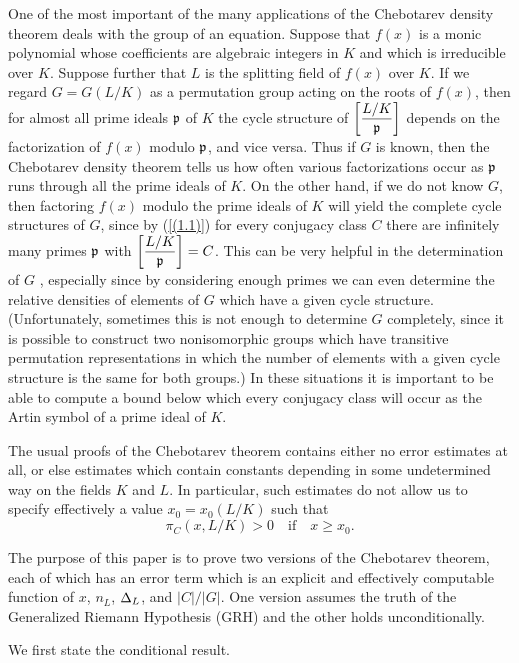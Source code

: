 \documentclass[./main]{subfiles}
\begin{document}
One of the most important of the many applications of the Chebotarev density theorem deals with the group of an equation. Suppose that $f(x)$ is a monic polynomial whose coefficients are algebraic integers in $K$ and which is irreducible over $K$. Suppose further that $L$ is the splitting field of $f(x)$ over $K$. If we regard $G = G(L/K)$ as a permutation group acting on the roots of $f(x)$, then for almost all prime ideals $\mathfrak{p}$ of $K$ the cycle structure of $\bigg[\dfrac{L/K}{\mathfrak{p}}\bigg]$ depends on the factorization of $f(x)$ modulo $\mathfrak{p}$, and vice versa. Thus if $G$ is known, then the Chebotarev density theorem tells us how often various factorizations occur as $\mathfrak{p}$ runs through all the prime ideals of $K$. On the other hand, if we do not know $G$, then factoring $f(x)$ modulo the prime ideals of $K$ will yield the complete cycle structures of $G$, since by (\ref{(1.1)}) for every conjugacy class $C$ there are infinitely many primes $\mathfrak{p}$ with $\bigg[\dfrac{L/K}{\mathfrak{p}}\bigg] = C$. This can be very helpful in the determination of $G$ \cite[vol. 1, pp. 189-192]{16-waerden1970}, especially since by considering enough primes we can even determine the relative densities of elements of $G$ which have a given  cycle structure. (Unfortunately, sometimes this is not enough to determine $G$ completely, since it is possible to construct two nonisomorphic groups which have transitive permutation representations in which the number of elements with a given cycle structure is the same for both groups.) In these situations it is important to be able to compute a bound below which every conjugacy class will occur as the Artin symbol of a prime ideal of $K$.

The usual proofs of the Chebotarev theorem contains either no error estimates at all, or else estimates which contain constants depending in some undetermined way on the fields $K$ and $L$. In particular, such estimates do not allow us to specify effectively a value $x_0 = x_0(L/K)$ such that
\[ \pi_C(x, L/K) > 0 \hspace{1em}\text{if} \hspace{1em} x\ge x_0. \tag{1.2}\label{(1.2)} \]

The purpose of this paper is to prove two versions of the Chebotarev theorem, each of which has an error term which is an explicit and effectively computable function of $x$, $n_L$, $\Delta_L$, and $|C|/|G|$. One version assumes the truth of the Generalized Riemann Hypothesis (GRH) and the other holds unconditionally.

We first state the conditional result.
\end{document}
